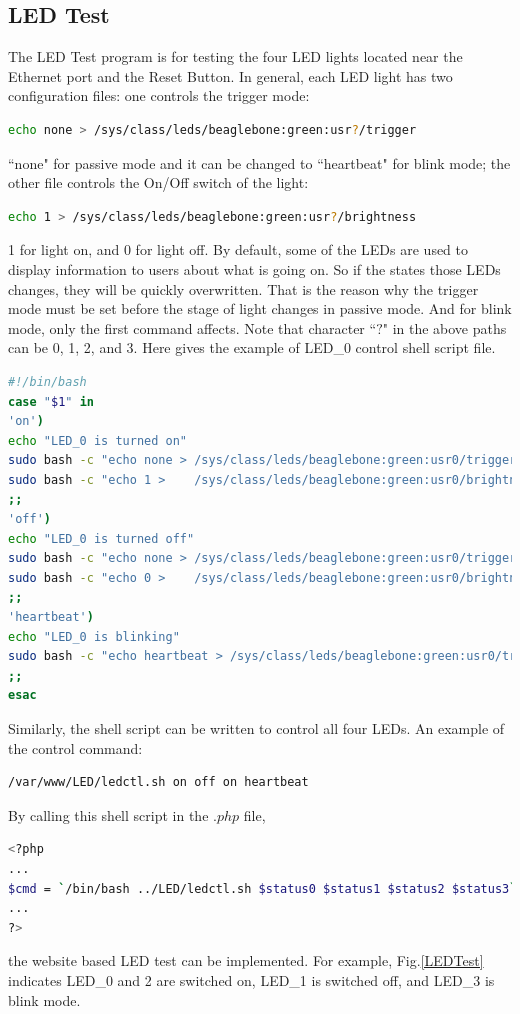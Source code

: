 \documentclass[12pt,journal,draftclsnofoot,onecolumn]{IEEEtran}
\begin{document}
\subsection{LED Test}\label{Led}
The LED Test program is for testing the four LED lights located near the Ethernet port and the Reset Button. In general, each LED light has two configuration files: one controls the trigger mode:
\begin{lstlisting}[language={bash}]
echo none > /sys/class/leds/beaglebone:green:usr?/trigger
\end{lstlisting}
``none" for passive mode and it can be changed to ``heartbeat" for blink mode; the other file controls the On/Off switch of the light:
\begin{lstlisting}[language={bash}]
echo 1 > /sys/class/leds/beaglebone:green:usr?/brightness
\end{lstlisting}
1 for light on, and 0 for light off. By default, some of the LEDs are used to display information to users about what is going on. So if the states those LEDs changes, they will be quickly overwritten. That is the reason why the trigger mode must be set before the stage of light changes in passive mode. And for blink mode, only the first command affects. Note that character ``$?$" in the above paths can be 0, 1, 2, and 3. Here gives the example of LED\_0 control shell script file.
\begin{lstlisting}[language={bash}]
#!/bin/bash
case "$1" in
'on')
echo "LED_0 is turned on"
sudo bash -c "echo none > /sys/class/leds/beaglebone:green:usr0/trigger"
sudo bash -c "echo 1 >    /sys/class/leds/beaglebone:green:usr0/brightness"
;;
'off')
echo "LED_0 is turned off"
sudo bash -c "echo none > /sys/class/leds/beaglebone:green:usr0/trigger"
sudo bash -c "echo 0 >    /sys/class/leds/beaglebone:green:usr0/brightness"
;;
'heartbeat')
echo "LED_0 is blinking"
sudo bash -c "echo heartbeat > /sys/class/leds/beaglebone:green:usr0/trigger"
;;
esac
\end{lstlisting}
Similarly, the shell script can be written to control all four LEDs. An example of the control command:
\begin{lstlisting}[language={bash}]
/var/www/LED/ledctl.sh on off on heartbeat
\end{lstlisting}
By calling this shell script in the $.php$ file,
\begin{lstlisting}[language={bash}]
<?php
...
$cmd = `/bin/bash ../LED/ledctl.sh $status0 $status1 $status2 $status3`;
...
?>
\end{lstlisting}
the website based LED test can be implemented. For example, Fig.\ref{LEDTest} indicates LED\_0 and 2 are switched on, LED\_1 is switched off, and LED\_3 is blink mode.
\end{document}
